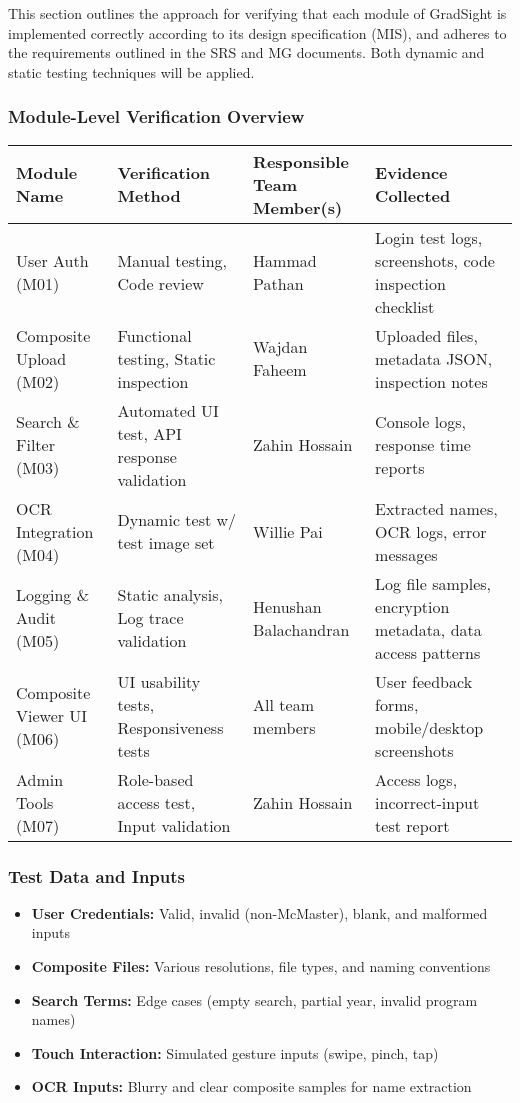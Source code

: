 \documentclass[12pt, titlepage]{article}
\begin{document}
This section outlines the approach for verifying that each module of GradSight is implemented correctly according to its design specification (MIS), and adheres to the requirements outlined in the SRS and MG documents. Both dynamic and static testing techniques will be applied.

\subsubsection*{Module-Level Verification Overview}

\begin{longtable}{|p{4cm}|p{4.5cm}|p{3.5cm}|p{4cm}|}
\hline
\textbf{Module Name} & \textbf{Verification Method} & \textbf{Responsible Team Member(s)} & \textbf{Evidence Collected} \\
\hline
User Auth (M01) & Manual testing, Code review & Hammad Pathan & Login test logs, screenshots, code inspection checklist \\
\hline
Composite Upload (M02) & Functional testing, Static inspection & Wajdan Faheem & Uploaded files, metadata JSON, inspection notes \\
\hline
Search \& Filter (M03) & Automated UI test, API response validation & Zahin Hossain & Console logs, response time reports \\
\hline
OCR Integration (M04) & Dynamic test w/ test image set & Willie Pai & Extracted names, OCR logs, error messages \\
\hline
Logging \& Audit (M05) & Static analysis, Log trace validation & Henushan Balachandran & Log file samples, encryption metadata, data access patterns \\
\hline
Composite Viewer UI (M06) & UI usability tests, Responsiveness tests & All team members & User feedback forms, mobile/desktop screenshots \\
\hline
Admin Tools (M07) & Role-based access test, Input validation & Zahin Hossain & Access logs, incorrect-input test report \\
\hline
\end{longtable}

\subsubsection*{Test Data and Inputs}

\begin{itemize}
  \item \textbf{User Credentials:} Valid, invalid (non-McMaster), blank, and malformed inputs
  \item \textbf{Composite Files:} Various resolutions, file types, and naming conventions
  \item \textbf{Search Terms:} Edge cases (empty search, partial year, invalid program names)
  \item \textbf{Touch Interaction:} Simulated gesture inputs (swipe, pinch, tap)
  \item \textbf{OCR Inputs:} Blurry and clear composite samples for name extraction
\end{itemize}
\end{document}
